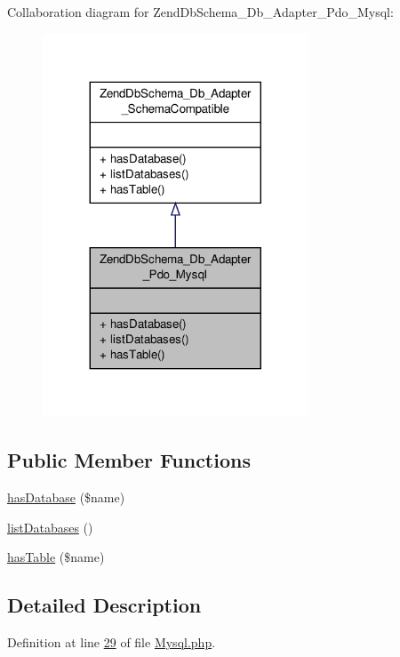 Collaboration diagram for Zend\-Db\-Schema\-\_\-\-Db\-\_\-\-Adapter\-\_\-\-Pdo\-\_\-\-Mysql\-:\nopagebreak
\begin{figure}[H]
\begin{center}
\leavevmode
\includegraphics[width=224pt]{classZendDbSchema__Db__Adapter__Pdo__Mysql__coll__graph}
\end{center}
\end{figure}
\subsection*{Public Member Functions}
\begin{DoxyCompactItemize}
\item 
\hyperlink{classZendDbSchema__Db__Adapter__Pdo__Mysql_a5b5112b727eccc4b13c3a04b6b1e49ab}{has\-Database} (\$name)
\item 
\hyperlink{classZendDbSchema__Db__Adapter__Pdo__Mysql_afa634812c724a9fcf35aeea357707d64}{list\-Databases} ()
\item 
\hyperlink{classZendDbSchema__Db__Adapter__Pdo__Mysql_af4d8bfe8fbba922c879569a3d9db0754}{has\-Table} (\$name)
\end{DoxyCompactItemize}


\subsection{Detailed Description}


Definition at line \hyperlink{Mysql_8php_source_l00029}{29} of file \hyperlink{Mysql_8php_source}{Mysql.\-php}.



